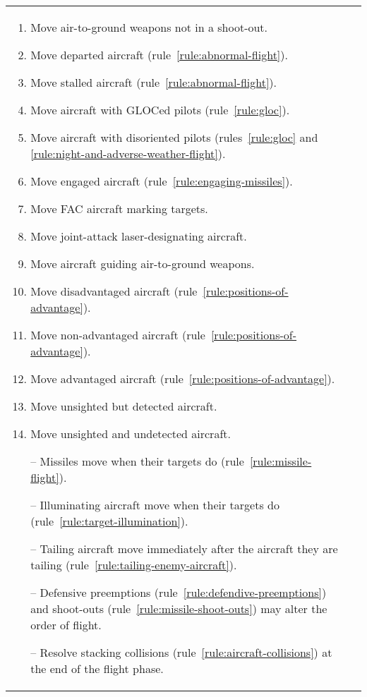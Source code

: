 \begin{twocolumntable}
\begin{tabularx}{1.0\linewidth}{L@{\hspace{\columnsep}}L}
{\begin{enumerate}[start=7]


\begin{enumerate}[nosep]
    \item Move air-to-ground weapons not in a shoot-out.
    \item Move departed aircraft (rule~\ref{rule:abnormal-flight}).
    \item Move stalled aircraft (rule~\ref{rule:abnormal-flight}).
    \item Move aircraft with GLOCed pilots (rule~\ref{rule:gloc}).
    \item Move aircraft with disoriented pilots (rules~\ref{rule:gloc} and \ref{rule:night-and-adverse-weather-flight}).
    \item Move engaged aircraft (rule~\ref{rule:engaging-missiles}).
    \item Move FAC aircraft marking targets.
    \item Move joint-attack laser-designating aircraft.
    \item Move aircraft guiding air-to-ground weapons.
    \item Move disadvantaged aircraft (rule~\ref{rule:positions-of-advantage}).
    \item Move non-advantaged aircraft (rule~\ref{rule:positions-of-advantage}).
    \item Move advantaged aircraft (rule~\ref{rule:positions-of-advantage}).
    \item Move unsighted but detected aircraft.
    \item Move unsighted and undetected aircraft.
    \item[--] Missiles move when their targets do (rule~\ref{rule:missile-flight}).
    \item[--] Illuminating aircraft move when their targets do (rule~\ref{rule:target-illumination}).
    \item[--] Tailing aircraft move immediately after the aircraft they are tailing (rule~\ref{rule:tailing-enemy-aircraft}).
    \item[--] Defensive preemptions (rule~\ref{rule:defendive-preemptions})  and shoot-outs (rule~\ref{rule:missile-shoot-outs}) may alter the order of flight.
    \item[--] Resolve stacking collisions (rule~\ref{rule:aircraft-collisions}) at the end of the flight phase.
\end{enumerate}


\end{enumerate}}
\end{tabularx}
\end{twocolumntable}
